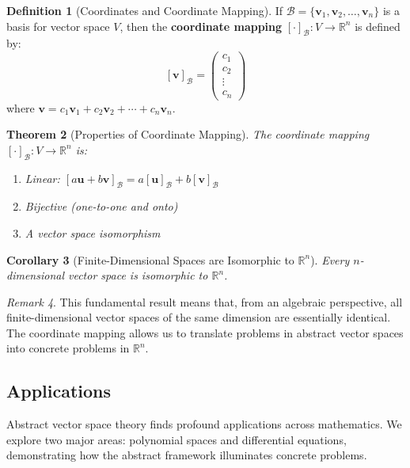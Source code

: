 \documentclass[12pt]{article}
\numberwithin{equation}{section}
\newcommand{\vect}[1]{\boldsymbol{#1}}   %
\theoremstyle{plain}
\newtheorem{theorem}{Theorem}[section]
\newtheorem{corollary}[theorem]{Corollary}
\theoremstyle{definition}
\newtheorem{definition}[theorem]{Definition}
\theoremstyle{remark}
\newtheorem{remark}[theorem]{Remark}
\begin{document}
\begin{definition}[Coordinates and Coordinate Mapping]
If $\mathcal{B} = \{\vect{v}_1, \vect{v}_2, \ldots, \vect{v}_n\}$ is a basis for vector space $V$, then the \textbf{coordinate mapping} $[\cdot]_{\mathcal{B}}: V \to \mathbb{R}^n$ is defined by:
$$[\vect{v}]_{\mathcal{B}} = \begin{pmatrix} c_1 \\ c_2 \\ \vdots \\ c_n \end{pmatrix}$$
where $\vect{v} = c_1\vect{v}_1 + c_2\vect{v}_2 + \cdots + c_n\vect{v}_n$.
\end{definition}

\begin{theorem}[Properties of Coordinate Mapping]
The coordinate mapping $[\cdot]_{\mathcal{B}}: V \to \mathbb{R}^n$ is:
\begin{enumerate}
\item Linear: $[a\vect{u} + b\vect{v}]_{\mathcal{B}} = a[\vect{u}]_{\mathcal{B}} + b[\vect{v}]_{\mathcal{B}}$
\item Bijective (one-to-one and onto)
\item A vector space isomorphism
\end{enumerate}
\end{theorem}

\begin{corollary}[Finite-Dimensional Spaces are Isomorphic to $\mathbb{R}^n$]
Every $n$-dimensional vector space is isomorphic to $\mathbb{R}^n$.
\end{corollary}

\begin{remark}
This fundamental result means that, from an algebraic perspective, all finite-dimensional vector spaces of the same dimension are essentially identical. The coordinate mapping allows us to translate problems in abstract vector spaces into concrete problems in $\mathbb{R}^n$.
\end{remark}

\subsection{Applications}

Abstract vector space theory finds profound applications across mathematics. We explore two major areas: polynomial spaces and differential equations, demonstrating how the abstract framework illuminates concrete problems.
\end{document}
